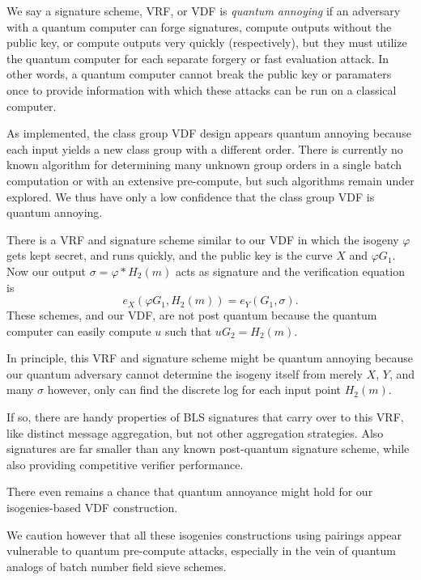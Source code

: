 \documentclass{article}
\newcommand\mathperiod{.}
\begin{document}
We say a signature scheme, VRF, or VDF is {\em quantum annoying} if
an adversary with a quantum computer can forge signatures, compute
outputs without the public key, or compute outputs very quickly
(respectively), but they must utilize the quantum computer for each
separate forgery or fast evaluation attack.
In other words, a quantum computer cannot break the public key or
paramaters once to provide information with which these attacks can
be run on a classical computer. 

As implemented, the class group VDF design appears quantum annoying
because each input yields a new class group with a different order.
There is currently no known algorithm for determining many unknown
group orders in a single batch computation or with an extensive
pre-compute, but such algorithms remain under explored.  We thus
have only a low confidence that the class group VDF is quantum annoying.

There is a VRF and signature scheme similar to our VDF in which the
isogeny $φ$ gets kept secret, and runs quickly, and the public key
is the curve $X$ and $φ G_1$.  Now our output $\sigma = φ* H_2(m)$
acts as signature and the verification equation is 
$$ e_X( φ G_1, H_2(m) ) = e_Y( G_1, \sigma ) \mathperiod $$
These schemes, and our VDF, are not post quantum because the
quantum computer can easily compute $u$ such that $u G_2 = H_2(m)$.

In principle, this VRF and signature scheme might be quantum annoying
because our quantum adversary cannot determine the isogeny itself
from merely $X$, $Y$, and many $\sigma$ however, only can find the
discrete log for each input point $H_2(m)$.

If so, there are handy properties of BLS signatures that carry over
to this VRF, like distinct message aggregation, but not other
aggregation strategies.  Also signatures are far smaller than any
known post-quantum signature scheme, while also providing competitive
verifier performance.  

There even remains a chance that quantum annoyance might hold for
our isogenies-based VDF construction.

We caution however that all these isogenies constructions using
pairings appear vulnerable to quantum pre-compute attacks, especially
in the vein of quantum analogs of batch number field sieve schemes.  
\end{document}
